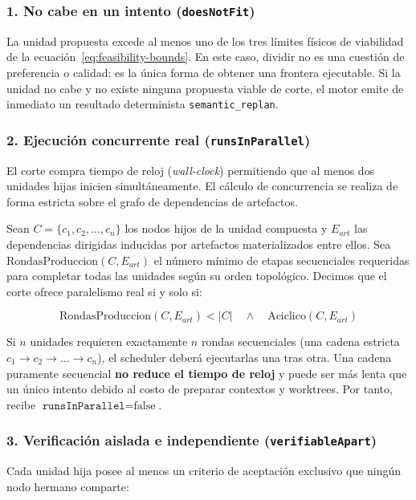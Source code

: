 \subsubsection{1. No cabe en un intento (\texttt{doesNotFit})}
La unidad propuesta excede al menos uno de los tres límites físicos de viabilidad de la ecuación~\ref{eq:feasibility-bounds}. En este caso, dividir no es una cuestión de preferencia o calidad: es la única forma de obtener una frontera ejecutable. Si la unidad no cabe y no existe ninguna propuesta viable de corte, el motor emite de inmediato un resultado determinista \texttt{semantic\_replan}.

\subsubsection{2. Ejecución concurrente real (\texttt{runsInParallel})}
El corte compra tiempo de reloj (\emph{wall-clock}) permitiendo que al menos dos unidades hijas inicien simultáneamente. El cálculo de concurrencia se realiza de forma estricta sobre el grafo de dependencias de artefactos.

Sean $C = \{c_1, c_2, \dots, c_n\}$ los nodos hijos de la unidad compuesta y $E_{art}$ las dependencias dirigidas inducidas por artefactos materializados entre ellos. Sea $\text{RondasProduccion}(C, E_{art})$ el número mínimo de etapas secuenciales requeridas para completar todas las unidades según su orden topológico. Decimos que el corte ofrece paralelismo real si y solo si:

\begin{equation}
\text{RondasProduccion}(C, E_{art}) < |C| \quad \land \quad \text{Aciclico}(C, E_{art})
\label{eq:parallel-rounds}
\end{equation}

\noindent Si $n$ unidades requieren exactamente $n$ rondas secuenciales (una cadena estricta $c_1 \rightarrow c_2 \rightarrow \dots \rightarrow c_n$), el scheduler deberá ejecutarlas una tras otra. Una cadena puramente secuencial \textbf{no reduce el tiempo de reloj} y puede ser más lenta que un único intento debido al costo de preparar contextos y worktrees. Por tanto, recibe $\texttt{runsInParallel} = \text{false}$.

\subsubsection{3. Verificación aislada e independiente (\texttt{verifiableApart})}
Cada unidad hija posee al menos un criterio de aceptación exclusivo que ningún nodo hermano comparte:

